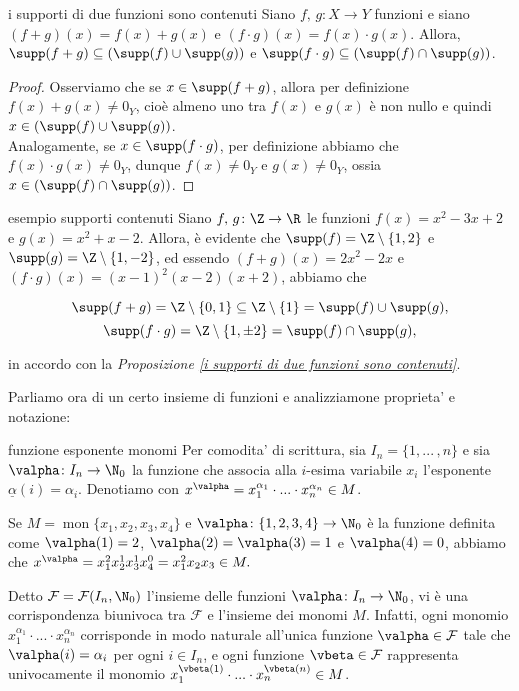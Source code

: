 \begin{prop}[]{i supporti di due funzioni sono contenuti} 
  Siano $f,\,g\colon X\to Y$ funzioni e siano $(f+g)(x)=f(x)+g(x)$ e $(f\cdot g)(x)=f(x)\cdot g(x)$. 
  Allora, $\supp(f+g)\subseteq (\supp(f)\cup \supp(g))$ e $\supp(f\cdot g)\subseteq (\supp(f)\cap \supp(g))$. 
\end{prop}
\vspace{-4mm}
\begin{proof}
  Osserviamo che se $x\in \supp(f+g)$, allora per definizione $f(x)+g(x)\neq 0_Y$, cioè almeno uno tra $f(x)$ e $g(x)$ è non nullo 
  e quindi $x\in (\supp(f)\cup \supp(g))$. \\
  Analogamente, se $x\in \supp(f\cdot g)$, per definizione abbiamo che $f(x)\cdot g(x)\neq 0_Y$, 
  dunque $f(x)\neq 0_Y$ e $g(x)\neq 0_Y$, ossia $x\in (\supp(f)\cap \supp(g))$.
\end{proof}

\begin{example}[]{esempio supporti contenuti}
  Siano $f,\,g\colon \Z\to\R$ le funzioni $f(x)=x^2-3x+2$ e $g(x)=x^2+x-2$. 
  Allora, è evidente che $\supp(f)=\Z\setminus\{ 1,2\}$ e $\supp(g)=\Z\setminus \{ 1,-2 \}$, 
  ed essendo $(f+g)(x)=2x^2-2x$ e $(f\cdot g)(x)=(x-1)^2(x-2)(x+2)$, abbiamo che 

  $$\supp(f+g)=\Z\setminus\{0,1\}\subseteq \Z\setminus\{1\} = \supp(f)\cup\supp(g),$$ 
  $$\supp(f\cdot g)=\Z\setminus \{1,\pm 2\} = \supp(f)\cap\supp(g),$$ 

  \noindent in accordo con la \emph{Proposizione \ref{i supporti di due funzioni sono contenuti}}.
\end{example}

\noindent Parliamo ora di un certo insieme di funzioni e analizziamone proprieta' e notazione:

\begin{observ}[]{funzione esponente monomi} 
  Per comodita' di scrittura, sia $I_n=\{1,...\,,n\}$ e sia $\valpha \colon I_n\to\N_0$ 
  la funzione che associa alla $i$-esima variabile $x_i$ l'esponente $\underline{\alpha}(i)=\alpha_i$. 
  Denotiamo con $x^{\valpha}=x_1^{\alpha_1}\cdot ... \cdot x_n^{\alpha_n}\in M$. 

  \begin{exm}
    Se $M=\operatorname{mon}\{x_1,x_2,x_3,x_4\}$ e $\valpha\colon \{1,2,3,4\}\to \N_0$ è la funzione definita 
    come $\valpha(1)=2$, $\valpha(2)=\valpha(3)=1$ e $\valpha(4)=0$, abbiamo che $x^{\valpha}=x_1^2 x_2^1 x_3^1 x_4^0=x_1^2 x_2 x_3\in M.$
  \end{exm}

  \noindent Detto $\mathcal{F}=\mathcal{F}(I_n, \N_0)$ l'insieme delle funzioni $\valpha \colon I_n\to\N_0$\footnotemark , 
  vi è una corrispondenza biunivoca tra $\mathcal{F}$ e l'insieme dei monomi $M$. 
  Infatti, ogni monomio $x_1^{\alpha_1}\cdot ...\cdot x_n^{\alpha_n}$ corrisponde in modo naturale all'unica funzione 
  $\valpha\in\mathcal{F}$ tale che $\valpha(i)=\alpha_i$ per ogni $i\in I_n$, e ogni funzione $\vbeta \in\mathcal{F}$ 
  rappresenta univocamente il monomio $x_1^{\vbeta(1)}\cdot ... \cdot x_n^{\vbeta(n)}\in M$.
\end{observ}

